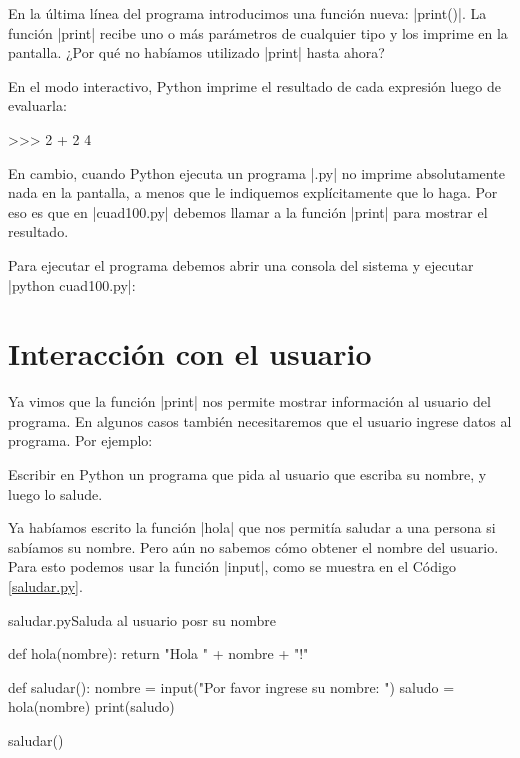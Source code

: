 En la última línea del programa introducimos una función nueva: |print()|.
La función |print| recibe uno o más parámetros de cualquier tipo y los imprime
en la pantalla. ¿Por qué no habíamos utilizado |print| hasta ahora?

En el modo interactivo, Python imprime el resultado de cada expresión luego de
evaluarla:

\begin{codigo-python-sn}
>>> 2 + 2
4
\end{codigo-python-sn}

En cambio, cuando Python ejecuta un programa |.py| no imprime absolutamente
nada en la pantalla, a menos que le indiquemos explícitamente que lo haga. Por
eso es que en |cuad100.py| debemos llamar a la función |print| para mostrar el
resultado.

Para ejecutar el programa debemos abrir una consola del sistema y ejecutar
|python cuad100.py|:


\section{Interacción con el usuario}

Ya vimos que la función |print| nos permite mostrar información al usuario del
programa. En algunos casos también necesitaremos que el usuario ingrese datos
al programa. Por ejemplo:

\begin{problema}
Escribir en Python un programa que pida al usuario que escriba su nombre, y
luego lo salude.

\begin{solucion}
Ya habíamos escrito la función |hola| que nos permitía saludar a una
persona si sabíamos su nombre. Pero aún no sabemos cómo obtener el nombre del
usuario. Para esto podemos usar la función |input|, como se muestra en el
Código \ref{saludar.py}.

\begin{codigo}{saludar.py}{Saluda al usuario posr su nombre}
\label{saludar.py}
\begin{codigo-python}
def hola(nombre):
    return "Hola " + nombre + "!"

def saludar():
    nombre = input("Por favor ingrese su nombre: ")
    saludo = hola(nombre)
    print(saludo)

saludar()
\end{codigo-python}
\end{codigo}
\end{solucion}
\end{problema}

